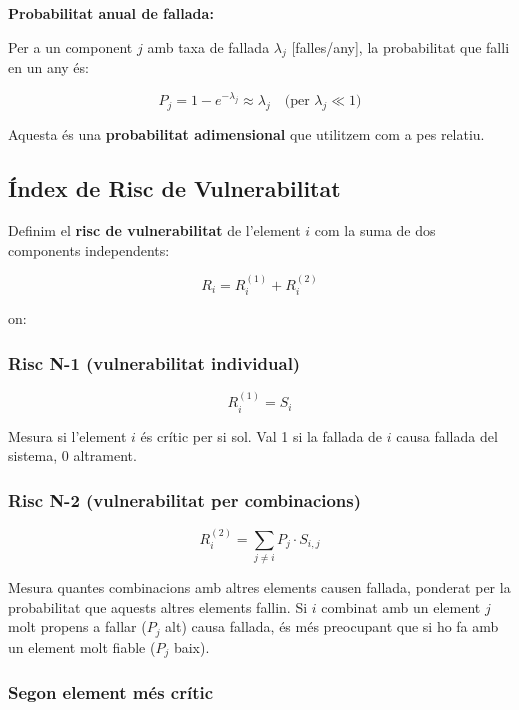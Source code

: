 \documentclass[11pt,a4paper]{article}
\begin{document}
\textbf{Probabilitat anual de fallada:}

Per a un component $j$ amb taxa de fallada $\lambda_j$ [falles/any], la probabilitat que falli en un any és:

\begin{equation}
P_j = 1 - e^{-\lambda_j} \approx \lambda_j \quad \text{(per } \lambda_j \ll 1\text{)}
\end{equation}

Aquesta és una \textbf{probabilitat adimensional} que utilitzem com a pes relatiu.

\subsection{Índex de Risc de Vulnerabilitat}

Definim el \textbf{risc de vulnerabilitat} de l'element $i$ com la suma de dos components independents:

\begin{equation}
\boxed{R_i = R_i^{(1)} + R_i^{(2)}}
\end{equation}

on:

\subsubsection*{Risc N-1 (vulnerabilitat individual)}

\begin{equation}
\boxed{R_i^{(1)} = S_i}
\end{equation}

Mesura si l'element $i$ és crític per si sol. Val 1 si la fallada de $i$ causa fallada del sistema, 0 altrament.

\subsubsection*{Risc N-2 (vulnerabilitat per combinacions)}

\begin{equation}
\boxed{R_i^{(2)} = \sum_{j \neq i} P_j \cdot S_{i,j}}
\end{equation}

Mesura quantes combinacions amb altres elements causen fallada, ponderat per la probabilitat que aquests altres elements fallin. Si $i$ combinat amb un element $j$ molt propens a fallar ($P_j$ alt) causa fallada, és més preocupant que si ho fa amb un element molt fiable ($P_j$ baix).

\subsubsection*{Segon element més crític}
\end{document}
